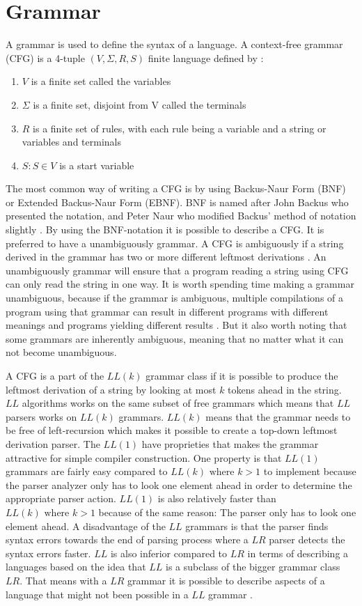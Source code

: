 \section{Grammar}
\label{sec:grammar}
A grammar is used to define the syntax of a language. A context-free grammar (CFG) is a 4-tuple $(V, \Sigma, R, S)$ finite language defined by \citep{sipser}:
\begin{enumerate}
	\item $V$ is a finite set called the variables
	\item $\Sigma$ is a finite set, disjoint from V called the terminals
	\item $R$ is a finite set of rules, with each rule being a variable and a string or variables and terminals
	\item $S: S \in V$ is a start variable
\end{enumerate}

The most common way of writing a CFG is by using Backus-Naur Form (BNF) or Extended Backus-Naur Form (EBNF). BNF is named after John Backus who presented the notation, and Peter Naur who modified Backus' method of notation slightly \citep{sebesta}. By using the BNF-notation it is possible to describe a CFG. It is preferred to have a unambiguously grammar. A CFG is ambiguously if a string derived in the grammar has two or more different leftmost derivations \citep{sipser}. An unambiguously grammar will ensure that a program reading a string using CFG can only read the string in one way.
It is worth spending time making a grammar unambiguous, because if the grammar is ambiguous, multiple compilations of a program using that grammar can result in different programs with different meanings and programs yielding different results \citep{sebesta}. But it also worth noting that some grammars are inherently ambiguous, meaning that no matter what it can not become unambiguous.


A CFG is a part of the $LL(k)$ grammar class if it is possible to produce the leftmost derivation of a string by looking at most $k$ tokens ahead in the string. $LL$ algorithms works on the same subset of free grammars which means that $LL$ parsers works on $LL(k)$ grammars. $LL(k)$ means that the grammar needs to be free of left-recursion which makes it possible to create a top-down leftmost derivation parser.
The $LL(1)$ have proprieties that makes the grammar attractive for simple compiler construction. One property is that $LL(1)$ grammars are fairly easy compared to $LL(k)\text{ where }k > 1$ to implement because the parser analyzer only has to look one element ahead in order to determine the appropriate parser action. $LL(1)$ is also relatively faster than $LL(k)\text{ where }k > 1$ because of the same reason: The parser only has to look one element ahead. A disadvantage of the $LL$ grammars is that the parser finds syntax errors towards the end of parsing process where a $LR$ parser detects the syntax errors faster. $LL$ is also inferior compared to $LR$ in terms of describing a languages based on the idea that $LL$ is a subclass of the bigger grammar class $LR$. That means with a $LR$ grammar it is possible to describe aspects of a language that might not been possible in a $LL$ grammar \citep{CraftingACompiler} \citep{sebesta}.


